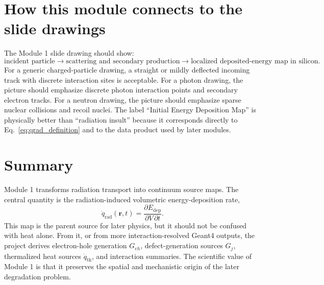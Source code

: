 \documentclass[11pt]{article}
\newcommand{\Edep}{E_{\mathrm{dep}}}
\newcommand{\qrad}{\dot{q}_{\mathrm{rad}}}
\newcommand{\qth}{\dot{q}_{\mathrm{th}}}
\newcommand{\rpos}{\mathbf{r}}
\newcommand{\Geh}{G_{eh}}
\begin{document}
\section{How this module connects to the slide drawings}

The Module 1 slide drawing should show:
\begin{equation}
\text{incident particle}
\longrightarrow
\text{scattering and secondary production}
\longrightarrow
\text{localized deposited-energy map in silicon}.
\end{equation}
For a generic charged-particle drawing, a straight or mildly deflected incoming track with discrete interaction sites is acceptable. For a photon drawing, the picture should emphasize discrete photon interaction points and secondary electron tracks. For a neutron drawing, the picture should emphasize sparse nuclear collisions and recoil nuclei. The label ``Initial Energy Deposition Map'' is physically better than ``radiation insult'' because it corresponds directly to Eq.~\eqref{eq:qrad_definition} and to the data product used by later modules.

\section{Summary}

Module 1 transforms radiation transport into continuum source maps. The central quantity is the radiation-induced volumetric energy-deposition rate,
\begin{equation}
\qrad(\rpos,t)=\frac{\partial \Edep}{\partial V\,\partial t}.
\end{equation}
This map is the parent source for later physics, but it should not be confused with heat alone. From it, or from more interaction-resolved Geant4 outputs, the project derives electron-hole generation $\Geh$, defect-generation sources $G_j$, thermalized heat sources $\qth$, and interaction summaries. The scientific value of Module 1 is that it preserves the spatial and mechanistic origin of the later degradation problem.
\end{document}
